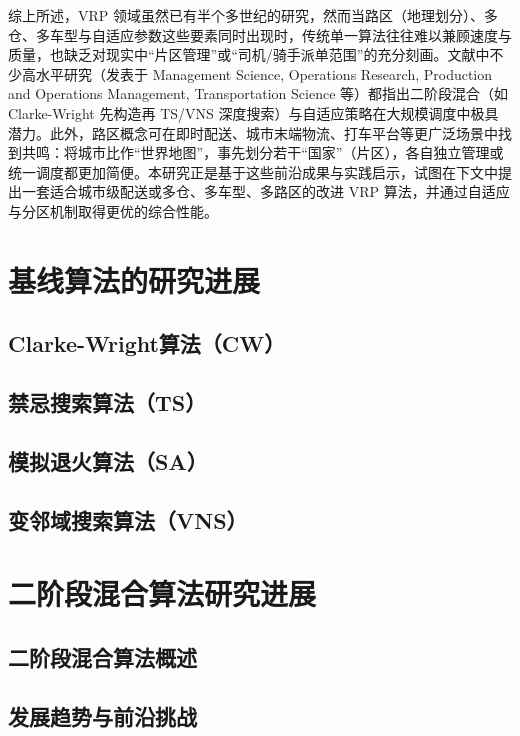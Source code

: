 \documentclass[12pt,a4paper,twoside]{ctexbook}
\begin{document}
综上所述，VRP 领域虽然已有半个多世纪的研究，然而当路区（地理划分）、多仓、多车型与自适应参数这些要素同时出现时，传统单一算法往往难以兼顾速度与质量，也缺乏对现实中“片区管理”或“司机/骑手派单范围”的充分刻画。文献中不少高水平研究（发表于 Management Science, Operations Research, Production and Operations Management, Transportation Science 等）都指出二阶段混合（如 Clarke-Wright 先构造再 TS/VNS 深度搜索）与自适应策略在大规模调度中极具潜力。此外，路区概念可在即时配送、城市末端物流、打车平台等更广泛场景中找到共鸣：将城市比作“世界地图”，事先划分若干“国家”（片区），各自独立管理或统一调度都更加简便。本研究正是基于这些前沿成果与实践启示，试图在下文中提出一套适合城市级配送或多仓、多车型、多路区的改进 VRP 算法，并通过自适应与分区机制取得更优的综合性能。

\section{基线算法的研究进展}

\subsection{Clarke-Wright算法（CW）}

\subsection{禁忌搜索算法（TS）}

\subsection{模拟退火算法（SA）}

\subsection{变邻域搜索算法（VNS）}

\section{二阶段混合算法研究进展}

\subsection{二阶段混合算法概述}

\subsection{发展趋势与前沿挑战}
\end{document}
